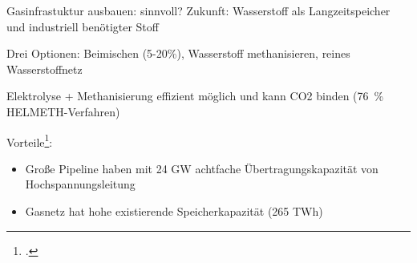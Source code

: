 \documentclass[10pt]{beamer}
\begin{document}
\begin{frame}{Gasinfrastuktur ausbauen: sinnvoll?}
  Zukunft: Wasserstoff als Langzeitspeicher und industriell benötigter Stoff

  Drei Optionen: Beimischen (5-20\%), Wasserstoff methanisieren, reines Wasserstoffnetz

  Elektrolyse + Methanisierung effizient möglich und kann CO2 binden (76~\% HELMETH-Verfahren)

  Vorteile\footcite{iis}: 
  \begin{itemize}
    \item Große Pipeline haben mit 24 GW achtfache Übertragungskapazität von Hochspannungsleitung
    \item Gasnetz hat hohe existierende Speicherkapazität (265 TWh)
  \end{itemize}
\end{frame}

\begin{frame}[allowframebreaks]

  \printbibliography

\end{frame}
\end{document}

